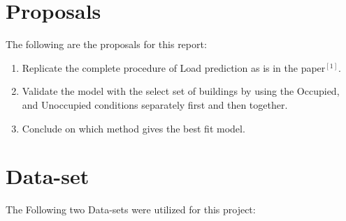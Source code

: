 \documentclass[a4paper,11pt]{article}
\begin{document}
\section{Proposals}
The following are the proposals for this report:
\begin{enumerate}
\itemsep0em
\item Replicate the complete procedure of Load prediction as is in the paper$^{[1]}$.
\item Validate the model with the select set of buildings by using the Occupied, and Unoccupied conditions separately first and then together.
\item Conclude on which method gives the best fit model.
\end{enumerate}
\section{Data-set}
The Following two Data-sets were utilized for this project:
\end{document}
